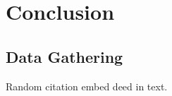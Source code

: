 \chapter{Conclusion}
\section{Data Gathering}

Random citation \cite{sterner2002ecological} embed deed in text.